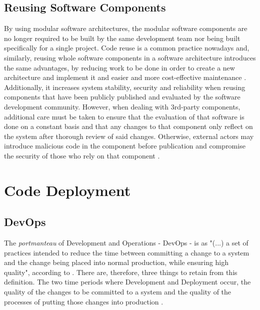 \subsection{Reusing Software Components}

By using modular software architectures, the modular software components are no longer required to be built by the same development team nor being built specifically for a single project. 
Code reuse is a common practice nowadays and, similarly, reusing whole software components in a software architecture introduces the same advantages, by reducing work to be done in order to create a new architecture and implement it and easier and more cost-effective maintenance \Parencite{hasselbring2018software}. Additionally, it increases system stability, security and reliability when reusing components that have been publicly published and evaluated by the software development community. However, when dealing with 3rd-party components, additional care must be taken to ensure that the evaluation of that software is done on a constant basis and that any changes to that component only reflect on the system after thorough review of said changes. Otherwise, external actors may introduce malicious code in the component before publication and compromise the security of those who rely on that component \Parencite{tal_2022}.













\section{Code Deployment}\label{state-of-the-art:s:code-deployment}




\subsection{DevOps}\label{state-of-the-art:ss:devops}

The \textit{portmanteau} of Development and Operations - DevOps - is as "(...) a set of practices intended to reduce the time between committing a change to a system and the change being placed into normal production, while ensuring high quality", according to \parencite{bass_weber_zhu_2015}. There are, therefore, three things to retain from this definition. The two time periods where Development and Deployment occur, the quality of the changes to be committed to a system and the quality of the processes of putting those changes into production \parencite{sallin_kropp_anslow_quilty_meier_2021}.

